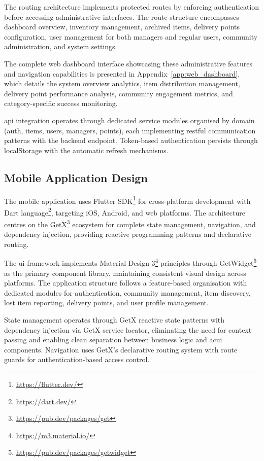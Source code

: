 The routing architecture implements protected routes by enforcing authentication before accessing administrative interfaces. The route structure encompasses dashboard overview, inventory management, archived items, delivery points configuration, user management for both managers and regular users, community administration, and system settings.

The complete web dashboard interface showcasing these administrative features and navigation capabilities is presented in Appendix~\ref{app:web_dashboard}, which details the system overview analytics, item distribution management, delivery point performance analysis, community engagement metrics, and category-specific success monitoring.

\ac{api} integration operates through dedicated service modules organised by domain (auth, items, users, managers, points), each implementing \ac{rest}ful communication patterns with the backend endpoint. Token-based authentication persists through localStorage with the automatic refresh mechanisms.

\subsection{Mobile Application Design} \label{subsection:mobile_application}

The mobile application uses Flutter SDK\footnote{\url{https://flutter.dev/}} for cross-platform development with Dart language\footnote{\url{https://dart.dev/}}, targeting iOS, Android, and web platforms. The architecture centres on the GetX\footnote{\url{https://pub.dev/packages/get}} ecosystem for complete state management, navigation, and dependency injection, providing reactive programming patterns and declarative routing.

The \ac{ui} framework implements Material Design 3\footnote{\url{https://m3.material.io/}} principles through GetWidget\footnote{\url{https://pub.dev/packages/getwidget}} as the primary component library, maintaining consistent visual design across platforms. The application structure follows a feature-based organisation with dedicated modules for authentication, community management, item discovery, lost item reporting, delivery points, and user profile management.

State management operates through GetX reactive state patterns with dependency injection via GetX service locator, eliminating the need for context passing and enabling clean separation between business logic and ac{ui} components. Navigation uses GetX's declarative routing system with route guards for authentication-based access control.

